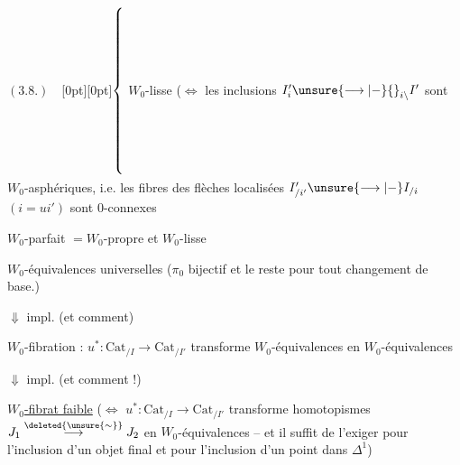 

$(3.8.)\quad$\raisebox{-5.5\baselineskip}[0pt][0pt]{$\left\{\vphantom{\rule[-5.5\baselineskip]{0pt}{11\baselineskip}}\right.$}\,$W_0$-lisse ($\Longleftrightarrow$ les inclusions $I'_i\unsure{\longrightarrow|\mathbin{-}}{}_{i\backslash}I'$ sont $W_0$-asphériques, i.e. les fibres des flèches localisées  $I'_{/i'}\unsure{\longrightarrow|\mathbin{-}}I_{/i}$ $(i=ui')$ sont $0$-connexes

$W_0$-parfait $=W_0$-propre et $W_0$-lisse

$W_0$-équivalences universelles ($\pi_0$ bijectif et le reste pour tout changement de base.)


$\Downarrow$ impl.  (et comment)


$W_0$-fibration : $u^*:\mathrm{Cat}_{/I}\longrightarrow\mathrm{Cat}_{/I'}$ transforme $W_0$-équivalences en $W_0$-équivalences


$\Downarrow$ impl.  (et comment !)


\uline{$W_0$-fibrat faible} ($\Longleftrightarrow$  $u^*:\mathrm{Cat}_{/I}\longrightarrow\mathrm{Cat}_{/I'}$ transforme homotopismes $J_1\overset{\deleted{\unsure{\sim}}}{\longrightarrow}J_2$ en $W_0$-équivalences -- et il suffit de l'exiger pour l'inclusion d'un objet final   et pour l'inclusion d'un point dans $\Delta^1$)


